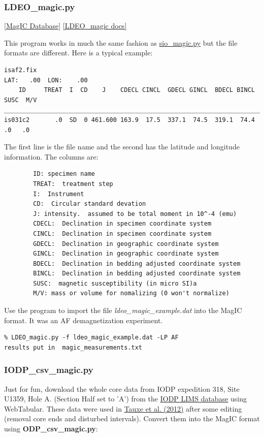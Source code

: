 \documentclass[11pt]{book}
\begin{document}
{{\subsubsection{LDEO\_magic.py}
\href{#MagICDatabase}{[MagIC Database]}
\href{https://github.com/PmagPy/PmagPy/blob/master/programs/LDEO_magic.py}{[LDEO\_magic docs]}


This program works in much the same fashion as \href{#sio_magic.py}{sio\_magic.py} but the file formats are different.  Here is a typical example:

\begin{verbatim}
isaf2.fix
LAT:   .00  LON:    .00
    ID     TREAT  I  CD    J    CDECL CINCL  GDECL GINCL  BDECL BINCL  SUSC  M/V
________________________________________________________________________________
is031c2       .0  SD  0 461.600 163.9  17.5  337.1  74.5  319.1  74.4    .0   .0
\end{verbatim}
The first line is the file name and the second has the latitude and longitude information. The columns are:
\begin{verbatim}
        ID: specimen name
        TREAT:  treatment step
        I:  Instrument
        CD:  Circular standard devation
        J: intensity.  assumed to be total moment in 10^-4 (emu)
        CDECL:  Declination in specimen coordinate system
        CINCL:  Declination in specimen coordinate system
        GDECL:  Declination in geographic coordinate system
        GINCL:  Declination in geographic coordinate system
        BDECL:  Declination in bedding adjusted coordinate system
        BINCL:  Declination in bedding adjusted coordinate system
        SUSC:  magnetic susceptibility (in micro SI)a
        M/V: mass or volume for nomalizing (0 won't normalize)
\end{verbatim}

Use the program to import the file {\it ldeo\_magic\_example.dat} into the MagIC format.  It was an AF demagnetization experiment.

\begin{verbatim}
% LDEO_magic.py -f ldeo_magic_example.dat -LP AF
results put in  magic_measurements.txt
\end{verbatim}

\subsubsection{IODP\_csv\_magic.py}

Just for fun, download the whole core data from IODP expedition 318, Site U1359, Hole A. (Section Half set to 'A') from the \href{#LIMS}{IODP LIMS database} using WebTabular.    These data were used in \href{http://dx.doi.org/10.1029/2012PA002308}{Tauxe et al. (2012)} \nocite{tauxe12} after some editing (removal core ends and disturbed intervals).   Convert them into the MagIC format using {\bf ODP\_csv\_magic.py}:

}}
\end{document}
